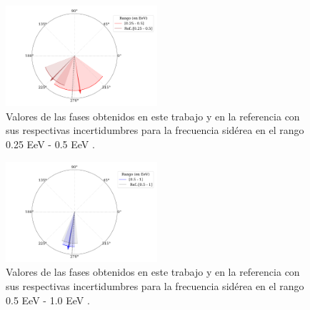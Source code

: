 \begin{figure}[H]
    \begin{small}
        \begin{center}
            \includegraphics[width=0.5\textwidth]{phase_primer_bin.pdf}
        \end{center}
        \caption{Valores de las fases obtenidos en este trabajo y en la referencia con sus respectivas incertidumbres para la frecuencia sidérea en el  rango 0.25 EeV - 0.5 EeV .}
        \label{fig:primer}
    \end{small}
\end{figure}

\begin{figure}[H]
    \begin{small}
        \begin{center}
            \includegraphics[width=0.5\textwidth]{phase_segundo_bin.pdf}
        \end{center}
        \caption{Valores de las fases obtenidos en este trabajo y en la referencia con sus respectivas incertidumbres para la frecuencia sidérea en el  rango 0.5 EeV - 1.0 EeV .}
        \label{fig:segundo}
    \end{small}
\end{figure}

